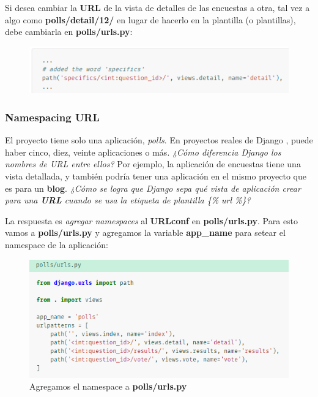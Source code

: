 \documentclass[10pt]{article}
\newcommand{\django}[1]{{\textcolor{G}{Django} #1}}
\begin{document}
Si desea cambiar la \textbf{URL} de la vista de detalles de las encuestas a otra, tal vez a algo como \textbf{polls/detail/12/} en lugar de hacerlo en la plantilla (o plantillas), debe cambiarla en \textbf{polls/urls.py}:

\begin{figure}[H]
\begin{center}
\includegraphics[scale=1]{figuras/3/33/336/img4.png}
\end{center}
\end{figure}

\subsubsection{Namespacing URL}
El proyecto tiene solo una aplicación, \textit{polls}. En proyectos reales de \django{}, puede haber cinco, diez, veinte aplicaciones o más. \textit{¿Cómo diferencia Django los nombres de URL entre ellos?} Por ejemplo, la aplicación de encuestas tiene una vista detallada, y también podría tener una aplicación en el mismo proyecto que es para un \textbf{blog}. \textit{¿Cómo se logra que \django{} sepa qué vista de aplicación crear para una \textbf{URL} cuando se usa la etiqueta de plantilla \{\% url \%\}?}

La respuesta es \textit{agregar namespaces} al \textbf{URLconf} en \textbf{polls/urls.py}. Para esto vamos a \textbf{polls/urls.py} y agregamos la variable \textbf{app\_name} para setear el namespace de la aplicación:

\begin{figure}[H]
\begin{center}
\includegraphics[scale=1]{figuras/3/33/337/img1.png}
\caption{Agregamos el namespace a \textbf{polls/urls.py}}
\end{center}
\end{figure}
\end{document}
